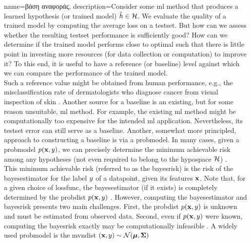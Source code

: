 {name={\foreignlanguage{greek}{βάση αναφοράς}},
    description={Consider 
	some \gls{ml} method that produces a learned \gls{hypothesis} (or trained \gls{model}) $\hat{h} \in \mathcal{H}$. 
	We evaluate the quality of a trained \gls{model} 
    	by computing the average \gls{loss} on a \gls{testset}. But how can we assess 
    	whether the resulting \gls{testset} performance is sufficiently good? How can we 
    	determine if the trained \gls{model} performs close to optimal such that there is little point 
    	in investing more resources (for \gls{data} collection or computation) to improve it? 
    	To this end, it is useful to have a reference (or baseline) level against which 
    	we can compare the performance of the trained \gls{model}. \\
	Such a reference value might be obtained from human performance, e.g., the misclassification rate of dermatologists 
   	who diagnose cancer from visual inspection of skin \cite{SkinHumanAI}. Another source for a baseline is an existing, 
    	but for some reason unsuitable, \gls{ml} method. For example, the existing \gls{ml} method 
    	might be computationally too expensive for the intended \gls{ml} application. 
    	Nevertheless, its \gls{testset} error can still serve as a baseline. Another, somewhat more principled, 
    	approach to constructing a baseline is via a \gls{probmodel}. In many cases, given a \gls{probmodel} $p({\bf x},y)$,  
    	we can precisely determine the \gls{minimum} achievable \gls{risk} among any hypotheses
    	(not even required to belong to the \gls{hypospace} $\mathcal{H}$) \cite{LC}. \\
    	This \gls{minimum} achievable \gls{risk} (referred to as the \gls{bayesrisk}) is the \gls{risk} 
    	of the \gls{bayesestimator} for the \gls{label} $y$ of a \gls{datapoint}, given
    	its \gls{feature}s ${\bf x}$. Note that, for a given choice of \gls{lossfunc}, the 
    	\gls{bayesestimator} (if it exists) is completely determined by the \gls{probdist} $p({\bf x},y)$ \cite[Ch. 4]{LC}. 
    	However, computing the \gls{bayesestimator} and \gls{bayesrisk} presents two 
    	main challenges. First, the \gls{probdist} $p({\bf x},y)$ is unknown and must be estimated from observed \gls{data}.
    	Second, even if $p({\bf x},y)$ were known, computing the \gls{bayesrisk} exactly may be computationally 
	infeasible \cite{cooper1990computational}. 
	A widely used \gls{probmodel} is the \gls{mvndist} $\left( {\bf x},y \right) \sim \mathcal{N}({\bm \mu},{\bm \Sigma})$ 
}}

